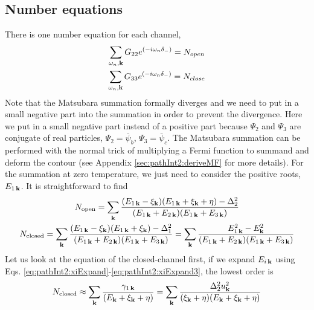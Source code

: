 \subsection{Number equations}
There is one  number equation for each channel,  
\begin{gather*}
\sum_{\omega_{n}, \mathbf{k}}G_{22}e^{(-i\omega_n\delta_-)}=N_{open}\\
\sum_{\omega_{n},\mathbf{k}}G_{33}e^{(-i\omega_n\delta_-)}=N_{close}
\end{gather*}
Note that the Matsubara summation  formally diverges and we need to put in a small negative part into the summation in order to prevent the divergence.  Here we put in a small  negative part instead of a positive part  because $\Psi_{2}$ and $\Psi_{3}$ are conjugate of real particles, $\Psi_2=\bar\psi_b$, $\Psi_3=\bar\psi_c$.  The Matsubara summation can be performed with the normal trick of multiplying a Fermi function to summand and deform the contour  (see Appendix \ref{sec:pathInt2:deriveMF} for more details).  For the summation at zero temperature, we just need to consider the positive roots, $E_{1\,\mathbf{k}}$.  It is straightforward to find 
\begin{gather}
N_{\text{open}}=\sum_{\mathbf{k}}\frac{(E_{1\,\mathbf{k}}-\xi_{\mathbf{k}})(E_{1\,\mathbf{k}}+\xi_{\mathbf{k}}+\eta)-\Delta_2^2}{(E_{1\,\mathbf{k}}+E_{2\,\mathbf{k}})(E_{1\,\mathbf{k}}+E_{3\,\mathbf{k}})}
\label{eq:pathInt2:numOpen}\\
N_{\text{closed}}=\sum_{\mathbf{k}}\frac{(E_{1\,\mathbf{k}}-\xi_{\mathbf{k}})(E_{1\,\mathbf{k}}+\xi_{\mathbf{k}})-\Delta_1^2}{(E_{1\,\mathbf{k}}+E_{2\,\mathbf{k}})(E_{1\,\mathbf{k}}+E_{3\,\mathbf{k}})}
=\sum_{\mathbf{k}}\frac{E_{1\,\mathbf{k}}^2-E_{\mathbf{k}}^2}{(E_{1\,\mathbf{k}}+E_{2\,\mathbf{k}})(E_{1\,\mathbf{k}}+E_{3\,\mathbf{k}})}\label{eq:pathInt2:numClose}
\end{gather}
Let us look at the equation of the closed-channel first, if we expand $E_{i\,\mathbf{k}}$ using Eqs. \ref{eq:pathInt2:xiExpand}-\ref{eq:pathInt2:xiExpand3}, the lowest order is 
\begin{equation}\label{eq:pathInt2:closeD1}
N_{\text{closed}}\approx\sum_{\mathbf{k}}\frac{\gamma_{1\,\mathbf{k}}}{(E_{\mathbf{k}}+\xi_{\mathbf{k}}+\eta)}=\sum_{\mathbf{k}}\frac{\Delta_{2}^2u_{\mathbf{k}}^{2}}{(\xi_{\mathbf{k}}+\eta)(E_{\mathbf{k}}+\xi_{\mathbf{k}}+\eta)}
\end{equation}
